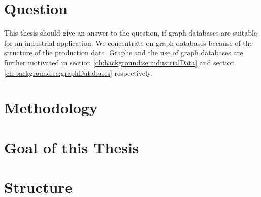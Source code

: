 \section{Question}
This thesis should give an answer to the question, if graph databases are suitable for an industrial application.
We concentrate on graph databases because of the structure of the production data.
Graphs and the use of graph databases are further motivated in section \ref{ch:background:se:industrialData} and section \ref{ch:background:se:graphDatabases} respectively.

\section{Methodology}

\section{Goal of this Thesis}

\section{Structure}
